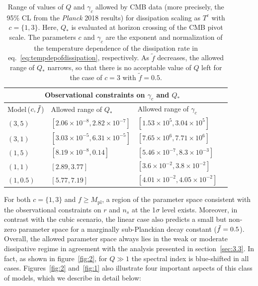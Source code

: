 \documentclass[a4paper,11pt]{article}
\begin{document}
\begin{table}[ht!]
\def\arraystretch{1.5}
\centering
    \begin{tabular}{l>{\raggedleft}p{}>{\raggedleft\arraybackslash}p{}>{\raggedleft\arraybackslash}p{}}
    \toprule
     \hline
     \multicolumn{3}{c}{Observational constraints on $\gamma_c$ and $Q_{*}$}\\
     \hline
Model\,($c,\Tilde{f}$) & Allowed range of $Q_{*}$ & Allowed range of $\gamma_c$\\
    \hline
    $(3,5)$ & $[2.06\times 10^{-8},2.82\times 10^{-7}]$ & $[1.53\times10^5,3.04\times10^5]$ \\
    $(3,1)$ & $[3.03\times10^{-5},6.31\times 10^{-5}]$ & $[7.65\times10^6,7.71\times10^6]$\\
    $(1,5)$ & $[8.19\times 10^{-8}, 0.14]$ & $[5.46\times 10^{-7},8.3\times 10^{-3}]$\\
    $(1,1)$ & $[2.89, 3.77]$ & $[3.6\times 10^{-2},3.8\times 10^{-2}]$ \\
    $(1,0.5)$ & $[5.77,7.19]$ & $[4.01\times 10^{-2},4.05\times 10^{-2}]$\\
    \hline
    \bottomrule
    \end{tabular}
    \caption{Range of values of $Q$ and $\gamma_c$ allowed by CMB data (more precisely, the 95\% CL from the \textit{Planck} 2018 results) for dissipation scaling as $T^c$ with $c=\{1,3\}$. Here, $Q_*$ is evaluated at horizon crossing of the CMB pivot scale. The parameters $c$ and $\gamma_c$ are the exponent and normalization of the temperature dependence of the dissipation rate in eq.~\eqref{eq:tempdepofdissipation}, respectively. As $\tilde f$ decreases, the allowed range of $Q_*$ narrows, so that there is no acceptable value of $Q$ left for the case of $c=3$ with $\tilde f = 0.5$.}
    \label{table:1}
\end{table}

For both $c=\{1,3\}$ and $f\geq M_\mathrm{pl}$, a region of the parameter space consistent with the observational constraints on $r$ and $n_s$ at the 1$\sigma$ level exists. Moreover, in contrast with the cubic scenario, the linear case also predicts a small but non-zero parameter space for a marginally sub-Planckian decay constant ($\Tilde{f}=0.5$). Overall, the allowed parameter space always lies in the weak or moderate dissipative regime in agreement with the analysis presented in section~\ref{sec:3.3}. In fact, as shown in figure~\ref{fig:2}, for $Q\gg 1$ the spectral index is blue-shifted in all cases. Figures~\ref{fig:2} and~\ref{fig:1} also illustrate four important aspects of this class of models, which we describe in detail below:
\end{document}
